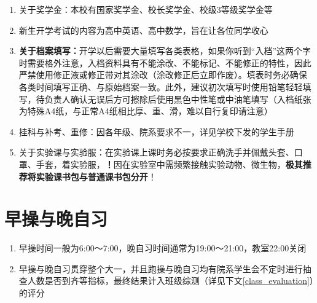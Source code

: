 \begin{enumerate}
\begin{enumerate}
\begin{enumerate}
                        \end{enumerate}
            \end{enumerate}
      \item 关于奖学金\footnotemark：本校有国家奖学金、校长奖学金、校级3等级奖学金等
      \item 新生开学考试\footnotemark 的内容为高中英语、高中数学，旨在让各位同学收心
      \item \textbf{关于档案填写：}开学以后需要大量填写各类表格，如果你听到“入档”这两个字时需要格外注意，入档资料具有不能涂改、不能标记、不能修正的特性，因此严禁使用修正液或修正带对其涂改（涂改修正后立即作废）。填表时务必确保各类时间填写正确、与原始档案一致。此外，建议初次填写时使用铅笔轻轻填写，待负责人确认无误后方可擦除后使用黑色中性笔或中油笔填写（入档纸张为特殊A4纸，与正常A4纸相比厚、重、滑，难以自行复印请注意）
      \item 挂科与补考、重修：因各年级、院系要求不一，详见学校下发的学生手册
      \item 关于实验课与实验服：在实验课上课时务必按要求正确洗手并佩戴头套、口罩、手套，着实验服，\textbf{！}因在实验室中需频繁接触实验动物、微生物，\textbf{极其推荐将实验课书包与普通课书包分开}！
            \label{schoolbag}
\end{enumerate}

\section[早操与晚自习]{早操与晚自习}
\begin{enumerate}
      \item 早操时间一般为6:00～7:00，晚自习时间通常为19:00～21:00，教室22:00关闭
      \item 早操与晚自习贯穿整个大一\footnotemark，并且跑操与晚自习均有院系学生会不定时进行抽查人数是否到齐等指标，最终结果计入班级综测（详见下文\uline{\ref{class_evaluation}}）的评分
\end{enumerate}

